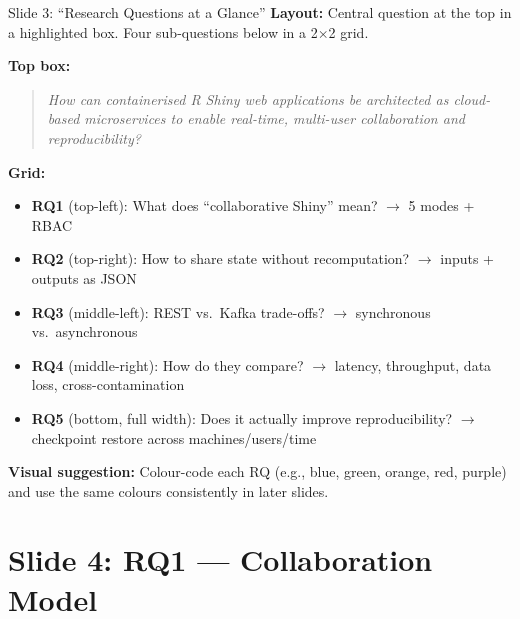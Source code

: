 \documentclass[12pt,a4paper]{article}
\begin{document}
\begin{slidebox}{Slide 3: ``Research Questions at a Glance''}
\textbf{Layout:} Central question at the top in a highlighted box. Four sub-questions below in a 2$\times$2 grid.

\textbf{Top box:}
\begin{quote}
\textit{How can containerised R Shiny web applications be architected as cloud-based microservices to enable real-time, multi-user collaboration and reproducibility?}
\end{quote}

\textbf{Grid:}
\begin{itemize}[nosep]
  \item \textbf{RQ1} (top-left): What does ``collaborative Shiny'' mean? $\rightarrow$ 5 modes + RBAC
  \item \textbf{RQ2} (top-right): How to share state without recomputation? $\rightarrow$ inputs + outputs as JSON
  \item \textbf{RQ3} (middle-left): REST vs.\ Kafka trade-offs? $\rightarrow$ synchronous vs.\ asynchronous
  \item \textbf{RQ4} (middle-right): How do they compare? $\rightarrow$ latency, throughput, data loss, cross-contamination
  \item \textbf{RQ5} (bottom, full width): Does it actually improve reproducibility? $\rightarrow$ checkpoint restore across machines/users/time
\end{itemize}

\textbf{Visual suggestion:} Colour-code each RQ (e.g., blue, green, orange, red, purple) and use the same colours consistently in later slides.
\end{slidebox}

\section{Slide 4: RQ1 --- Collaboration Model}
\end{document}
